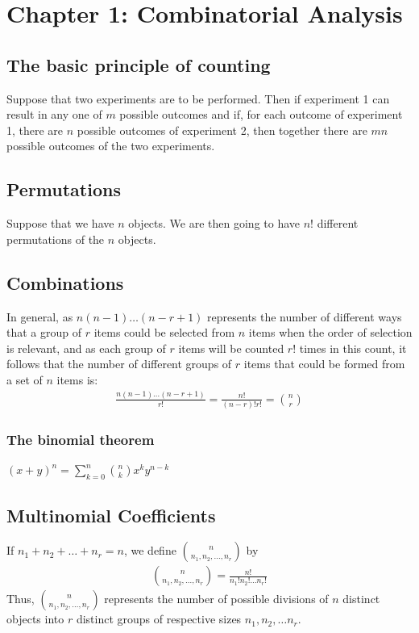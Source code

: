 \documentclass[a4paper]{article}
\begin{document}
\section{Chapter 1: Combinatorial Analysis} %
\label{sec:Chapter 1: Combinatorial Analysis}
\subsection{The basic principle of counting} %
\label{sub:The Basic principle of counting}
Suppose that two experiments are to be performed. Then if experiment 1 can result in any one of $m$ possible outcomes and if,
for each outcome of experiment 1, there are $n$ possible outcomes of experiment 2, then together there are $mn$ possible
outcomes of the two experiments.
\subsection{Permutations} %
\label{sub:Permutations}
Suppose that we have $n$ objects. We are then going to have $n!$ different permutations of the $n$ objects.
\subsection{Combinations} %
\label{sub:Combinations}
In general, as $n(n-1)\dots (n-r+1)$ represents the number of different ways that a group of $r$ items could be selected from $n$
items when the order of selection is relevant, and as each group of $r$ items will be counted $r!$ times in this count, it follows
that the number of different groups of $r$ items that could be formed from a set of $n$ items is: \\
\begin{align}
    \frac{n(n-1)\dots (n-r+1)}{r!}= \frac{n!}{(n-r)!r!}= { n \choose r } 
\end{align}
\subsubsection{The binomial theorem} %
\label{sub:The binomial theorem}

\begin{center}
  $(x+y)^n = \sum^n_{k=0} { n \choose k} x^k y^{n-k} $
\end{center}
\subsection{Multinomial Coefficients} %
\label{sub:Multinomial Coefficients}
If $n_1+n_2+ \dots + n_r = n$, we define ${ n \choose n_1,n_2,\dots, n_r}$ by
\begin{align}
  { n \choose n_1,n_2,\dots, n_r} = \frac{n!}{n_1!n_2! \dots n_r!}
\end{align}
Thus, ${ n \choose n_1,n_2,\dots, n_r}$ represents the number of possible divisions of $n$ distinct objects into $r$ distinct groups of respective sizes $n_1,n_2, \dots n_r$.
\end{document}

